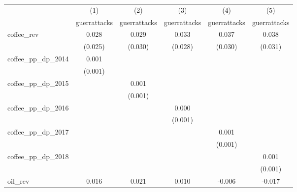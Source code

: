 {
\def\sym#1{\ifmmode^{#1}\else\(^{#1}\)\fi}
\begin{tabular}{l*{5}{c}}
\hline\hline
            &\multicolumn{1}{c}{(1)}&\multicolumn{1}{c}{(2)}&\multicolumn{1}{c}{(3)}&\multicolumn{1}{c}{(4)}&\multicolumn{1}{c}{(5)}\\
            &\multicolumn{1}{c}{guerrattacks}&\multicolumn{1}{c}{guerrattacks}&\multicolumn{1}{c}{guerrattacks}&\multicolumn{1}{c}{guerrattacks}&\multicolumn{1}{c}{guerrattacks}\\
\hline
coffee\_rev  &       0.028         &       0.029         &       0.033         &       0.037         &       0.038         \\
            &     (0.025)         &     (0.030)         &     (0.028)         &     (0.030)         &     (0.031)         \\
[1em]
coffee\_pp\_dp\_2014&       0.001         &                     &                     &                     &                     \\
            &     (0.001)         &                     &                     &                     &                     \\
[1em]
coffee\_pp\_dp\_2015&                     &       0.001         &                     &                     &                     \\
            &                     &     (0.001)         &                     &                     &                     \\
[1em]
coffee\_pp\_dp\_2016&                     &                     &       0.000         &                     &                     \\
            &                     &                     &     (0.001)         &                     &                     \\
[1em]
coffee\_pp\_dp\_2017&                     &                     &                     &       0.001         &                     \\
            &                     &                     &                     &     (0.001)         &                     \\
[1em]
coffee\_pp\_dp\_2018&                     &                     &                     &                     &       0.001         \\
            &                     &                     &                     &                     &     (0.001)         \\
[1em]
oil\_rev     &       0.016         &       0.021         &       0.010         &      -0.006         &      -0.017         \\

\end{tabular}}
